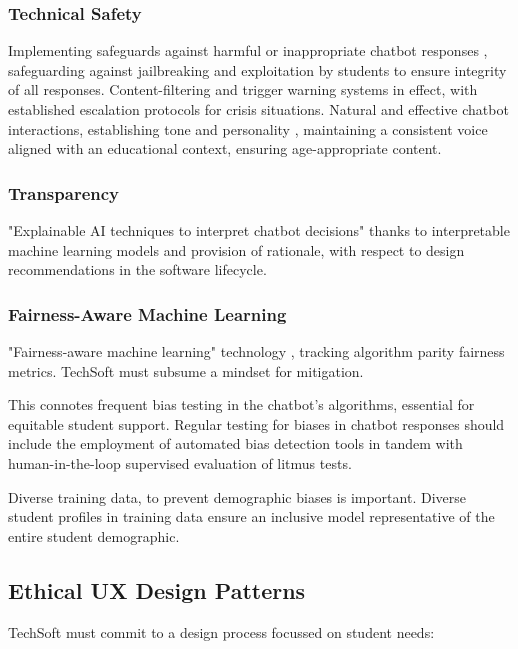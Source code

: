 \documentclass[14pt,a4paper]{article}
\begin{document}
\begin{multicols}{2}
\subsubsection{Technical Safety}
Implementing safeguards against harmful or inappropriate chatbot responses \textit{\parencite[p. e11510]{Bickmore2021}}, safeguarding against jailbreaking and exploitation by students to ensure integrity of all responses. Content-filtering and trigger warning systems in effect, with established escalation protocols for crisis situations. Natural and effective chatbot interactions, establishing tone and personality \textit{\parencite[pp. 20-50]{Bradbury2024}}, maintaining a consistent voice aligned with an educational context, ensuring age-appropriate content.

\subsubsection{Transparency}
 "Explainable AI techniques to interpret chatbot decisions" \textit{\parencite[pp. 82-115]{Arrieta2022}} thanks to interpretable machine learning models and provision of rationale, with respect to design recommendations in the software lifecycle.


 \subsubsection*{Fairness-Aware Machine Learning}
"Fairness-aware machine learning" technology \textit{\parencite{Barocas2021}}, tracking algorithm parity fairness metrics.
    TechSoft must subsume a mindset for mitigation.

This connotes frequent bias testing in the chatbot's algorithms, essential for equitable student support.
Regular testing for biases in chatbot responses \textit{\parencite{ACMFAccT2024}} should include the employment of automated bias detection tools in tandem with human-in-the-loop supervised evaluation of litmus tests.

Diverse training data, to prevent demographic biases \textit{\parencite[pp. 1-35]{Mehrabi2023}} is important. Diverse student profiles in training data ensure an inclusive model representative of the entire student demographic.


\subsection{Ethical UX Design Patterns}
TechSoft must commit to a design process focussed on student needs:


\end{multicols}
\end{document}
